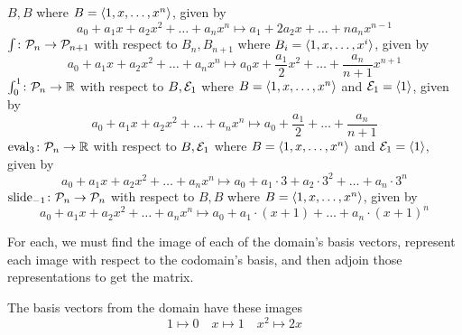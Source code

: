 \begin{exercises}
\begin{exparts}
        \( B,B \) where \( B=\langle1,x,\dots,x^n\rangle \), given by
        \begin{equation*}
            a_0+a_1x+a_2x^2+\dots+a_nx^n
            \mapsto
            a_1+2a_2x+\dots+na_nx^{n-1}
        \end{equation*}
      \partsitem \( \mbox{$\int\colon \mathcal{P}_n\to \mathcal{P}_{n+1}$} \) 
        with respect to
        \( B_n,B_{n+1} \) where \( B_i=\langle1,x,\dots,x^i\rangle \), given by
        \begin{equation*}
            a_0+a_1x+a_2x^2+\dots+a_nx^n
            \mapsto
            a_0x+\frac{a_1}{2}x^2+\dots+\frac{a_n}{n+1}x^{n+1}
        \end{equation*}
      \partsitem \( \mbox{$\int^1_0\colon \mathcal{P}_n\to \mathbb{R}$} \) with respect to
        \( B,{\cal E}_1 \) where \( B=\langle1,x,\dots,x^n\rangle \)
        and \( {\cal E}_1=\langle1\rangle \), given by
        \begin{equation*}
            a_0+a_1x+a_2x^2+\dots+a_nx^n
            \mapsto
            a_0+\frac{a_1}{2}+\dots+\frac{a_n}{n+1}
        \end{equation*}
      \partsitem \( \mbox{$\text{eval}_3\colon \mathcal{P}_n\to \mathbb{R}$} \) with respect to
        \( B,{\cal E}_1 \) where \( B=\langle1,x,\dots,x^n\rangle \)
        and \( {\cal E}_1=\langle1\rangle \), given by
        \begin{equation*}
            a_0+a_1x+a_2x^2+\dots+a_nx^n
            \mapsto
            a_0+a_1\cdot 3+a_2\cdot 3^2+\dots+a_n\cdot 3^n
        \end{equation*}
      \partsitem \( \mbox{$\text{slide}_{-1}\colon \mathcal{P}_n\to \mathcal{P}_n$} \) 
        with respect
        to \( B,B \) where \( B=\langle1,x,\ldots,x^n\rangle \), given by
        \begin{equation*}
            a_0+a_1x+a_2x^2+\dots+a_nx^n
            \mapsto
            a_0+a_1\cdot (x+1)+\dots+a_n\cdot (x+1)^n
        \end{equation*}
    \end{exparts}
    \begin{answer}
      For each, we must find the image of each of the domain's basis vectors,
      represent each image with respect to the codomain's basis,
      and then adjoin those representations to get the matrix.
      \begin{exparts}
        \partsitem The basis vectors from the domain have these images
          \begin{equation*}
            1\mapsto 0  
            \quad x\mapsto 1  
            \quad x^2\mapsto 2x  

\end{equation*}
\end{exparts}
\end{answer}
\end{exercises}
